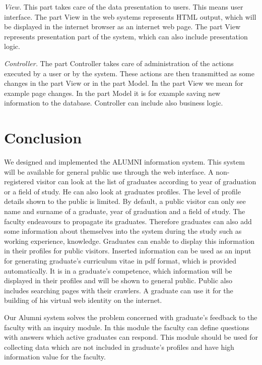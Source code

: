 \documentclass{iitsrc}[2006/14/02]
\begin{document}
{\em View.} This part takes care of the data presentation to users. This means user interface.  The part View in the web systems represents HTML output, which will be displayed in the internet browser as an internet web page. The part View represents presentation part of the system, which can also include presentation logic.

{\em Controller.} The part Controller takes care of administration of the actions executed by a user or by the system. These actions are then transmitted as some changes in the part View or in the part Model. In the part View we mean for example page changes. In the part Model it is for example saving new information to the database. Controller can include also business logic.
      
\section{Conclusion}

We designed and implemented the ALUMNI information system. This system will be available for general public use through the web interface. A non-registered visitor can look at the list of graduates according to year of graduation or a field of study. He can also look at graduates profiles. The level of profile details shown to the public is limited. By default, a public visitor can only see name and surname of a graduate, year of graduation and a field of study. The faculty endeavours to propagate its graduates. Therefore graduates can also add some information about themselves into the system during the study such as working experience, knowledge. Graduates can enable to display this information in their profiles for public visitors. Inserted information can be used as an input for generating graduate's curriculum vitae in pdf format, which is provided automatically. It is in a graduate's competence, which information will be displayed in their profiles and will be shown to general public. Public also includes searching pages with their crawlers. A graduate can use it for the building of his virtual web identity on the internet. 

Our Alumni system solves the problem concerned with graduate's feedback to the faculty with an inquiry module. In this module the faculty can define questions with answers which active graduates can respond. This module should be used for collecting data which are not included in graduate's profiles and have high information value for the faculty.

  

\nocite{team14}
\nocite{team15}
\nocite{cakephp}



\end{document}

